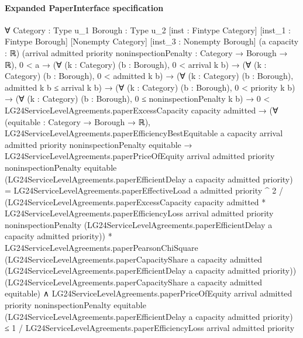\documentclass[10pt]{article}
\begin{document}
\paragraph{Expanded PaperInterface specification}
\begin{ReviewVerbatim}
∀ {Category : Type u_1} {Borough : Type u_2} [inst : Fintype Category] [inst_1 : Fintype Borough] [Nonempty Category]
  [inst_3 : Nonempty Borough] (a capacity : ℝ)
  (arrival admitted priority noninspectionPenalty : Category → Borough → ℝ),
  0 < a →
    (∀ (k : Category) (b : Borough), 0 < arrival k b) →
      (∀ (k : Category) (b : Borough), 0 < admitted k b) →
        (∀ (k : Category) (b : Borough), admitted k b ≤ arrival k b) →
          (∀ (k : Category) (b : Borough), 0 < priority k b) →
            (∀ (k : Category) (b : Borough), 0 ≤ noninspectionPenalty k b) →
              0 < LG24ServiceLevelAgreements.paperExcessCapacity capacity admitted →
                (∀ (equitable : Category → Borough → ℝ),
                    LG24ServiceLevelAgreements.paperEfficiencyBestEquitable a capacity arrival admitted priority
                        noninspectionPenalty equitable →
                      LG24ServiceLevelAgreements.paperPriceOfEquity arrival admitted priority noninspectionPenalty
                            equitable (LG24ServiceLevelAgreements.paperEfficientDelay a capacity admitted priority) =
                          LG24ServiceLevelAgreements.paperEffectiveLoad a admitted priority ^ 2 /
                              (LG24ServiceLevelAgreements.paperExcessCapacity capacity admitted *
                                LG24ServiceLevelAgreements.paperEfficiencyLoss arrival admitted priority
                                  noninspectionPenalty
                                  (LG24ServiceLevelAgreements.paperEfficientDelay a capacity admitted priority)) *
                            LG24ServiceLevelAgreements.paperPearsonChiSquare
                              (LG24ServiceLevelAgreements.paperCapacityShare a capacity admitted
                                (LG24ServiceLevelAgreements.paperEfficientDelay a capacity admitted priority))
                              (LG24ServiceLevelAgreements.paperCapacityShare a capacity admitted equitable) ∧
                        LG24ServiceLevelAgreements.paperPriceOfEquity arrival admitted priority noninspectionPenalty
                              equitable (LG24ServiceLevelAgreements.paperEfficientDelay a capacity admitted priority) ≤
                            1 /
                                LG24ServiceLevelAgreements.paperEfficiencyLoss arrival admitted priority

\end{ReviewVerbatim}
\end{document}
